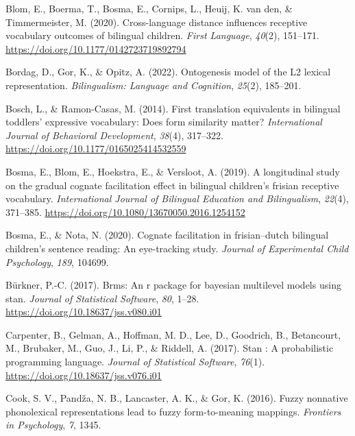 \documentclass[
]{article}
\newlength{\cslhangindent}
\newlength{\cslentryspacingunit} %
\newenvironment{CSLReferences}[2] %
 {%
  \setlength{\parindent}{0pt}
  \ifodd #1
  \let\oldpar\par
  \def\par{\hangindent=\cslhangindent\oldpar}
  \fi
  \setlength{\parskip}{#2\cslentryspacingunit}
 }%
 {}
\begin{document}
\begin{CSLReferences}{1}{0}
\leavevmode{}%
Blom, E., Boerma, T., Bosma, E., Cornips, L., Heuij, K. van den, \&
Timmermeister, M. (2020). Cross-language distance influences receptive
vocabulary outcomes of bilingual children. \emph{First Language},
\emph{40}(2), 151--171. \url{https://doi.org/10.1177/0142723719892794}

\leavevmode{}%
Bordag, D., Gor, K., \& Opitz, A. (2022). Ontogenesis model of the L2
lexical representation. \emph{Bilingualism: Language and Cognition},
\emph{25}(2), 185--201.

\leavevmode{}%
Bosch, L., \& Ramon-Casas, M. (2014). First translation equivalents in
bilingual toddlers' expressive vocabulary: Does form similarity matter?
\emph{International Journal of Behavioral Development}, \emph{38}(4),
317--322. \url{https://doi.org/10.1177/0165025414532559}

\leavevmode{}%
Bosma, E., Blom, E., Hoekstra, E., \& Versloot, A. (2019). A
longitudinal study on the gradual cognate facilitation effect in
bilingual children's frisian receptive vocabulary. \emph{International
Journal of Bilingual Education and Bilingualism}, \emph{22}(4),
371--385. \url{https://doi.org/10.1080/13670050.2016.1254152}

\leavevmode{}%
Bosma, E., \& Nota, N. (2020). Cognate facilitation in frisian--dutch
bilingual children's sentence reading: An eye-tracking study.
\emph{Journal of Experimental Child Psychology}, \emph{189}, 104699.

\leavevmode{}%
Bürkner, P.-C. (2017). Brms: An r package for bayesian multilevel models
using stan. \emph{Journal of Statistical Software}, \emph{80}, 1--28.
\url{https://doi.org/10.18637/jss.v080.i01}

\leavevmode{}%
Carpenter, B., Gelman, A., Hoffman, M. D., Lee, D., Goodrich, B.,
Betancourt, M., Brubaker, M., Guo, J., Li, P., \& Riddell, A. (2017).
Stan : A probabilistic programming language. \emph{Journal of
Statistical Software}, \emph{76}(1).
\url{https://doi.org/10.18637/jss.v076.i01}

\leavevmode{}%
Cook, S. V., Pandža, N. B., Lancaster, A. K., \& Gor, K. (2016). Fuzzy
nonnative phonolexical representations lead to fuzzy form-to-meaning
mappings. \emph{Frontiers in Psychology}, \emph{7}, 1345.


\end{CSLReferences}
\end{document}
